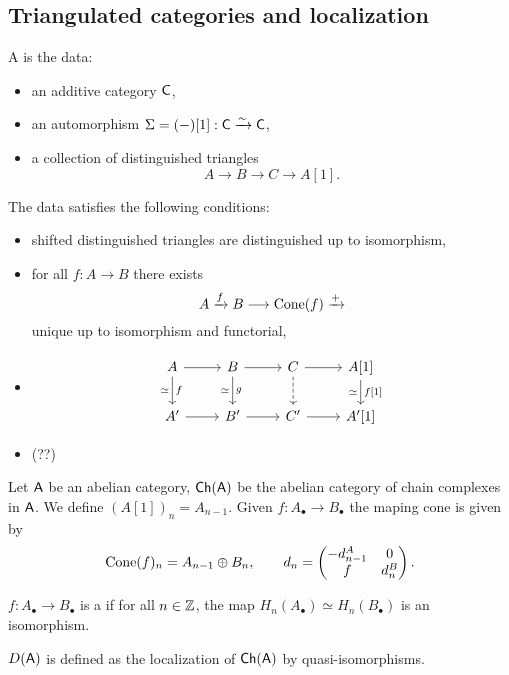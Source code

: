 \subsection{Triangulated categories and localization}
\begin{definition}
	A  is the data:
	\begin{itemize}
		\item an additive category $\mathsf{C}$,
		\item an automorphism $\Sigma=(-)[1]:\mathsf{C}\xrightarrow{\sim} \mathsf{C}$,
		\item a collection of distinguished triangles
			\[
				A \to B \to C \to A[1]
			.\] 
	\end{itemize}
	The data satisfies the following conditions:
	\begin{itemize}
		\item shifted distinguished triangles are distinguished up to isomorphism,
		\item for all $f:A\to B$ there exists
			\[
				A \xrightarrow{f} B \to \Cone(f) \xrightarrow{+}
			\] 
			unique up to isomorphism and functorial,
		\item 
			\begin{equation*}
			\begin{tikzcd}
				A \ar[r] \ar[d,"f","\simeq"'] & B \ar[r] \ar[d,"g","\simeq"'] & C \ar[d,dashed] \ar[r] & A[1] \ar[d,"{f[1]}","\simeq"'] \\
				A' \ar[r] & B' \ar[r] & C' \ar[r] & A'[1]
			\end{tikzcd}
			\end{equation*}	
		\item (??)
	\end{itemize}
\end{definition}

\begin{example}
	Let $\mathsf{A}$ be an abelian category, $\mathsf{Ch}(\mathsf{A})$ be the abelian category of chain complexes in $\mathsf{A}$. We define $(A[1])_n = A_{n-1}$. Given $f:A_\bullet\to B_\bullet$ the maping cone is given by
	\[
		\operatorname{Cone}(f)_n = A_{n-1} \oplus B_n,\qquad d_n = \begin{pmatrix} -d_{n-1}^{A} & 0 \\ f & d_n^{B} \end{pmatrix} 
	.\] 
\end{example}
\begin{definition}
	$f:A_\bullet\to B_\bullet$ is a  if for all $n\in \mathbb Z$, the map $H_n(A_\bullet)\simeq H_n(B_\bullet)$ is an isomorphism.
\end{definition}
\begin{definition}
	$D(\mathsf{A})$ is defined as the localization of $\mathsf{Ch}(\mathsf{A})$ by quasi-isomorphisms.
\end{definition}

